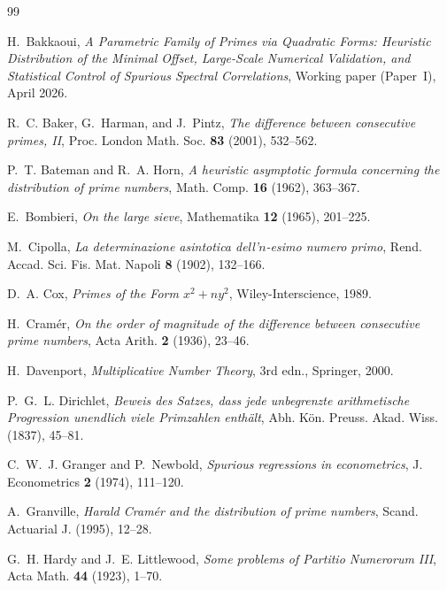 \documentclass[11pt,a4paper]{article}
\theoremstyle{definition}
\theoremstyle{remark}
\begin{document}
\begin{thebibliography}{99}

H.~Bakkaoui, \emph{A Parametric Family of Primes via Quadratic Forms:
Heuristic Distribution of the Minimal Offset, Large-Scale Numerical
Validation, and Statistical Control of Spurious Spectral
Correlations}, Working paper (Paper~I), April 2026.

R.~C. Baker, G.~Harman, and J.~Pintz, \emph{The difference between
consecutive primes, II}, Proc. London Math. Soc. \textbf{83}
(2001), 532--562.

P.~T. Bateman and R.~A. Horn, \emph{A heuristic asymptotic formula
concerning the distribution of prime numbers}, Math. Comp.
\textbf{16} (1962), 363--367.

E.~Bombieri, \emph{On the large sieve}, Mathematika \textbf{12}
(1965), 201--225.

M.~Cipolla, \emph{La determinazione asintotica dell'$n$-esimo
numero primo}, Rend. Accad. Sci. Fis. Mat. Napoli \textbf{8}
(1902), 132--166.

D.~A. Cox, \emph{Primes of the Form $x^{2}+ny^{2}$},
Wiley-Interscience, 1989.

H.~Cram\'er, \emph{On the order of magnitude of the difference
between consecutive prime numbers}, Acta Arith. \textbf{2} (1936),
23--46.

H.~Davenport, \emph{Multiplicative Number Theory}, 3rd edn.,
Springer, 2000.

P.~G.~L. Dirichlet, \emph{Beweis des Satzes, dass jede unbegrenzte
arithmetische Progression unendlich viele Primzahlen enth\"alt},
Abh. K\"on. Preuss. Akad. Wiss. (1837), 45--81.

C.~W.~J. Granger and P.~Newbold, \emph{Spurious regressions in
econometrics}, J. Econometrics \textbf{2} (1974), 111--120.

A.~Granville, \emph{Harald Cram\'er and the distribution of prime
numbers}, Scand. Actuarial J. (1995), 12--28.

G.~H. Hardy and J.~E. Littlewood, \emph{Some problems of Partitio
Numerorum III}, Acta Math. \textbf{44} (1923), 1--70.


\end{thebibliography}
\end{document}
